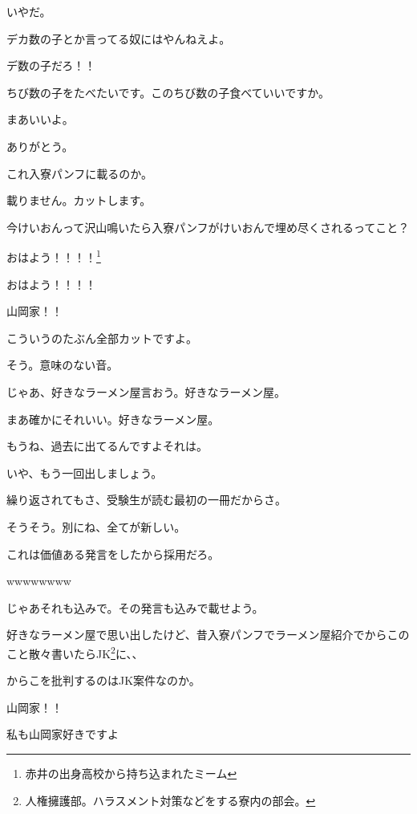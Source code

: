 \begin{multicols}{3}
いやだ。

デカ数の子とか言ってる奴にはやんねえよ。

デ数の子だろ！！

ちび数の子をたべたいです。このちび数の子食べていいですか。

まあいいよ。

ありがとう。

これ入寮パンフに載るのか。

載りません。カットします。

今けいおんって沢山鳴いたら入寮パンフがけいおんで埋め尽くされるってこと？

おはよう！！！！\footnote{赤井の出身高校から持ち込まれたミーム}

おはよう！！！！

山岡家！！

こういうのたぶん全部カットですよ。

そう。意味のない音。

\vspace{5mm}


\noindent{}

じゃあ、好きなラーメン屋言おう。好きなラーメン屋。

まあ確かにそれいい。好きなラーメン屋。

もうね、過去に出てるんですよそれは。

いや、もう一回出しましょう。

繰り返されてもさ、受験生が読む最初の一冊だからさ。

そうそう。別にね、全てが新しい。

これは価値ある発言をしたから採用だろ。

wwwwwwww

じゃあそれも込みで。その発言も込みで載せよう。

好きなラーメン屋で思い出したけど、昔入寮パンフでラーメン屋紹介でからこのこと散々書いたらJK\footnote{ 人権擁護部。ハラスメント対策などをする寮内の部会。}に、、

からこを批判するのはJK案件なのか。

山岡家！！

私も山岡家好きですよ


\end{multicols}
